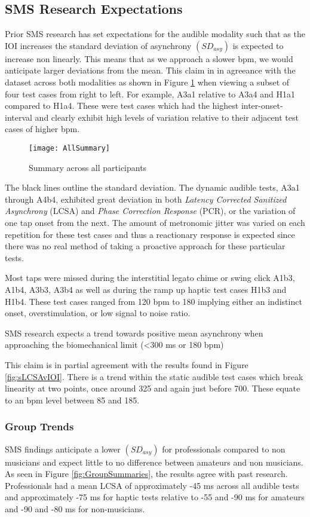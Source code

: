 \subsection{SMS Research Expectations}
Prior SMS research has set expectations for the audible modality such that as the IOI increases the standard deviation of asynchrony $(SD_{asy})$ is expected to increase non linearly. This means that as we approach a slower bpm, we would anticipate larger deviations from the mean. This claim in in agreeance with the dataset across both modalities as shown in Figure \ref{fig:AllSummary} when viewing a subset of four test cases from right to left. For example, A3a1 relative to A3a4 and H1a1 compared to H1a4. These were test cases which had the highest inter-onset-interval and clearly exhibit high levels of variation relative to their adjacent test cases of higher bpm.
\begin{figure}[H]
    \centering
    \texttt{[image: AllSummary]}
    \caption{Summary across all participants}
    \label{fig:AllSummary}
\end{figure}

The black lines outline the standard deviation. The dynamic audible tests, A3a1 through A4b4, exhibited great deviation in both \textit{Latency Corrected Sanitized Asynchrony} (LCSA) and \textit{Phase Correction Response} (PCR), or the variation of one tap onset from the next.  The amount of metronomic jitter was varied on each repetition for these test cases and thus a reactionary response is expected since there was no real method of taking a proactive approach for these particular tests.

Most taps were missed during the interstitial legato chime or swing click A1b3, A1b4, A3b3, A3b4 as well as during the ramp up haptic test cases H1b3 and H1b4. These test cases ranged from 120 bpm to 180 implying either an indistinct onset, overstimulation, or low signal to noise ratio.

SMS research expects a trend towards positive mean asynchrony when approaching the biomechanical limit (<300 ms or 180 bpm)


This claim is in partial agreement with the results found in Figure \ref{fig:sLCSAvIOI}. There is a trend within the static audible test cases which break linearity at two points, once around 325 and again just before 700. These equate to an bpm level between 85 and 185. 

\subsubsection{Group Trends}
SMS findings anticipate a lower $(SD_{asy})$ for professionals compared to non musicians and expect little to no difference between amateurs and non musicians. As seen in Figure \ref{fig:GroupSummaries}, the results agree with past research. Professionals had a mean LCSA of approximately -45 ms across all audible tests and approximately -75 ms for haptic tests relative to -55 and -90 ms for amateurs and -90 and -80 ms for non-musicians.

